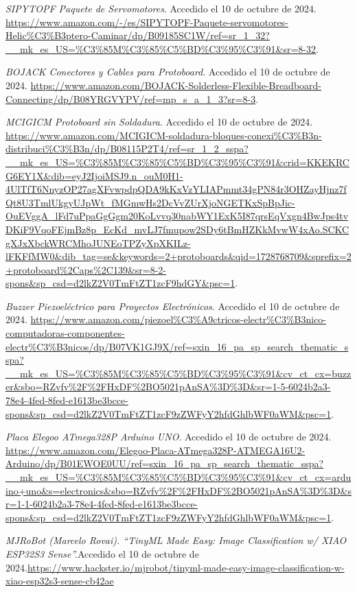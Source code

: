 \begin{thebibliography}{99}
    \textit{SIPYTOPF Paquete de Servomotores}. Accedido el 10 de octubre de 2024. \url{https://www.amazon.com/-/es/SIPYTOPF-Paquete-servomotores-Helic%C3%B3ptero-Caminar/dp/B09185SC1W/ref=sr_1_32?__mk_es_US=%C3%85M%C3%85%C5%BD%C3%95%C3%91&sr=8-32}.

    \textit{BOJACK Conectores y Cables para Protoboard}. Accedido el 10 de octubre de 2024. \url{https://www.amazon.com/BOJACK-Solderless-Flexible-Breadboard-Connecting/dp/B08YRGVYPV/ref=mp_s_a_1_3?sr=8-3}.

    \textit{MCIGICM Protoboard sin Soldadura}. Accedido el 10 de octubre de 2024. \url{https://www.amazon.com/MCIGICM-soldadura-bloques-conexi%C3%B3n-distribuci%C3%B3n/dp/B08115P2T4/ref=sr_1_2_sspa?__mk_es_US=%C3%85M%C3%85%C5%BD%C3%95%C3%91&crid=KKEKRCG6EY1X&dib=eyJ2IjoiMSJ9.n_ouM0H1-4UlTfT6NnyzOP27agXFvwpdpQDA9kKxVzYLIAPmmt34gPN84r3OHZayHjnz7fQt8U3TmlUkgyUJpWt_fMGmwHs2DcVvZUrXjoNGETKxSpBpJic-OuEVggA_lFd7uPpaGgGgm20KoLvvq30nabWY1ExK5I87qrsEqVxgn4BwJps4tvDKiF9VqoFEjmBz8p_EcKd_mvLJ7fmupow2SDy6tBmHZKkMvwW4xAo.SCKCgXJxXbckWRCMhoJUNEoTPZyXpXKILz-lFKFfMW0&dib_tag=se&keywords=2+protoboards&qid=1728768709&sprefix=2+protoboard%2Caps%2C139&sr=8-2-spons&sp_csd=d2lkZ2V0TmFtZT1zcF9hdGY&psc=1}.

    \textit{Buzzer Piezoeléctrico para Proyectos Electrónicos}. Accedido el 10 de octubre de 2024. \url{https://www.amazon.com/piezoel%C3%A9ctricos-electr%C3%B3nico-computadoras-componentes-electr%C3%B3nicos/dp/B07VK1GJ9X/ref=sxin_16_pa_sp_search_thematic_sspa?__mk_es_US=%C3%85M%C3%85%C5%BD%C3%95%C3%91&cv_ct_cx=buzzer&sbo=RZvfv%2F%2FHxDF%2BO5021pAnSA%3D%3D&sr=1-5-6024b2a3-78e4-4fed-8fed-e1613be3bcce-spons&sp_csd=d2lkZ2V0TmFtZT1zcF9zZWFyY2hfdGhlbWF0aWM&psc=1}.

    \textit{Placa Elegoo ATmega328P Arduino UNO}. Accedido el 10 de octubre de 2024. \url{https://www.amazon.com/Elegoo-Placa-ATmega328P-ATMEGA16U2-Arduino/dp/B01EWOE0UU/ref=sxin_16_pa_sp_search_thematic_sspa?__mk_es_US=%C3%85M%C3%85%C5%BD%C3%95%C3%91&cv_ct_cx=arduino+uno&s=electronics&sbo=RZvfv%2F%2FHxDF%2BO5021pAnSA%3D%3D&sr=1-1-6024b2a3-78e4-4fed-8fed-e1613be3bcce-spons&sp_csd=d2lkZ2V0TmFtZT1zcF9zZWFyY2hfdGhlbWF0aWM&psc=1}.

    \textit{MJRoBot (Marcelo Rovai). “TinyML Made Easy: Image Classification w/ XIAO ESP32S3 Sense”.}Accedido el 10 de octubre de 2024.\url{https://www.hackster.io/mjrobot/tinyml-made-easy-image-classification-w-xiao-esp32s3-sense-cb42ae}
    
\end{thebibliography}
